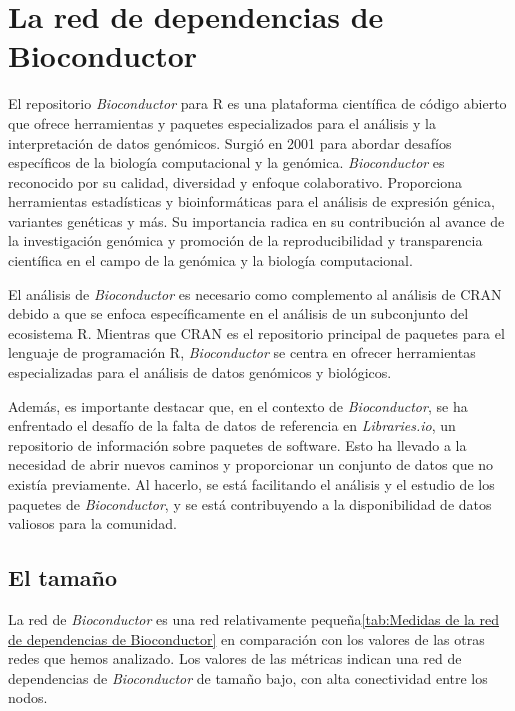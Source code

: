 \section{La red de dependencias de Bioconductor}

El repositorio \textit{Bioconductor} para R es una plataforma científica de código abierto que ofrece
herramientas y paquetes especializados para el análisis y la interpretación de datos genómicos.
Surgió en 2001 para abordar desafíos específicos de la biología computacional y la genómica.
\textit{Bioconductor} es reconocido por su calidad, diversidad y enfoque colaborativo. Proporciona
herramientas estadísticas y bioinformáticas para el análisis de expresión génica, variantes genéticas y más.
Su importancia radica en su contribución al avance de la investigación genómica y promoción de la
reproducibilidad y transparencia científica en el campo de la genómica y la biología computacional.

El análisis de \textit{Bioconductor} es necesario como complemento al análisis de CRAN debido a que se
enfoca específicamente en el análisis de un subconjunto del ecosistema R. Mientras que CRAN es el
repositorio principal de paquetes para el lenguaje de programación R, \textit{Bioconductor} se centra
en ofrecer herramientas especializadas para el análisis de datos genómicos y biológicos.

Además, es importante destacar que, en el contexto de \textit{Bioconductor}, se ha enfrentado el
desafío de la falta de datos de referencia en \textit{Libraries.io}, un repositorio de información
sobre paquetes de software. Esto ha llevado a la necesidad de abrir nuevos caminos y proporcionar
un conjunto de datos que no existía previamente. Al hacerlo, se está facilitando el análisis y el
estudio de los paquetes de \textit{Bioconductor}, y se está contribuyendo a la disponibilidad de
datos valiosos para la comunidad.

\subsection{El tamaño}

La red de \textit{Bioconductor} es una red relativamente pequeña\ref{tab:Medidas de la red de dependencias de Bioconductor}
en comparación con los valores de las otras redes que hemos analizado.
Los valores de las métricas indican una red de dependencias de \textit{Bioconductor} de tamaño bajo,
con alta conectividad entre los nodos.

